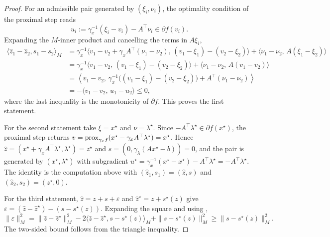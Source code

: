 \documentclass[11pt]{article}
\begin{document}
\begin{proof}
    For an admissible pair generated by $(\xi_i, \nu_i)$, the optimality condition of the proximal step reads
    \begin{equation}\label{eq:acc-prox-optimality}
        u_i := \gamma_x^{-1}(\xi_i - v_i) - A^\top\nu_i \in \partial f(v_i).
    \end{equation}
    Expanding the $M$-inner product and cancelling the terms in $A\xi_i$,
    \begin{align*}
        \langle \hat z_1 - \hat z_2, s_1 - s_2\rangle_M
        &= \gamma_x^{-1}\langle v_1 - v_2 + \gamma_x A^\top(\nu_1 - \nu_2),\, (v_1 - \xi_1) - (v_2 - \xi_2)\rangle
           + \langle \nu_1 - \nu_2,\, A(\xi_1 - \xi_2)\rangle \\
        &= \gamma_x^{-1}\langle v_1 - v_2,\, (v_1 - \xi_1) - (v_2 - \xi_2)\rangle
           + \langle \nu_1 - \nu_2,\, A(v_1 - v_2)\rangle \\
        &= \left\langle v_1 - v_2,\, \gamma_x^{-1}\big((v_1 - \xi_1) - (v_2 - \xi_2)\big) + A^\top(\nu_1 - \nu_2)\right\rangle \\
        &= -\langle v_1 - v_2,\, u_1 - u_2\rangle \leq 0,
    \end{align*}
    where the last inequality is the monotonicity of $\partial f$.
    This proves the first statement.

    For the second statement take $\xi = x^\star$ and $\nu = \lambda^\star$.
    Since $-A^\top\lambda^\star \in \partial f(x^\star)$, the proximal step returns $v = \mathrm{prox}_{\gamma_x f}(x^\star - \gamma_x A^\top\lambda^\star) = x^\star$.
    Hence $\hat z = (x^\star + \gamma_x A^\top\lambda^\star, \lambda^\star) = z^\star$ and $s = (0, \gamma_\lambda(Ax^\star - b)) = 0$, and the pair is generated by $(x^\star, \lambda^\star)$ with subgradient $u^\star = \gamma_x^{-1}(x^\star - x^\star) - A^\top\lambda^\star = -A^\top\lambda^\star$.
    The identity  is the computation above with $(\hat z_1, s_1) = (\hat z, s)$ and $(\hat z_2, s_2) = (z^\star, 0)$.

    For the third statement, $\hat z = z + s + \varepsilon$ and $\hat z^\star = z + s^\star(z)$ give $\varepsilon = (\hat z - \hat z^\star) - (s - s^\star(z))$.
    Expanding the square and using ,
    \begin{equation}\label{eq:true-update-drift-inequality}
        \|\varepsilon\|_M^2 = \|\hat z - \hat z^\star\|_M^2 - 2\langle \hat z - \hat z^\star, s - s^\star(z)\rangle_M + \|s - s^\star(z)\|_M^2 \geq \|s - s^\star(z)\|_M^2.
    \end{equation}
    The two-sided bound  follows from the triangle inequality.


\end{proof}
\end{document}
